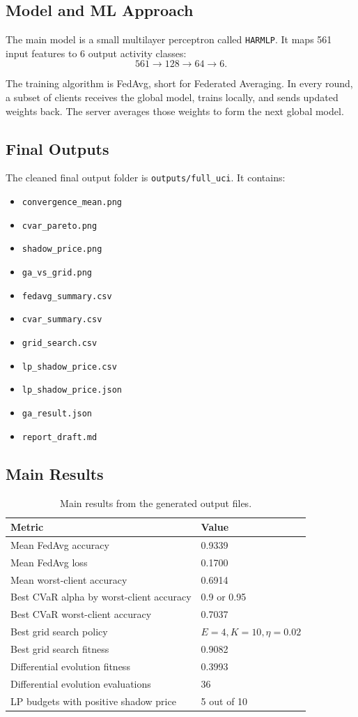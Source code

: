 \documentclass{article}
\begin{document}
\subsection{Model and ML Approach}
The main model is a small multilayer perceptron called \texttt{HARMLP}. It maps 561 input features to 6 output activity classes:
\[
561 \rightarrow 128 \rightarrow 64 \rightarrow 6.
\]

The training algorithm is FedAvg, short for Federated Averaging. In every round, a subset of clients receives the global model, trains locally, and sends updated weights back. The server averages those weights to form the next global model.

\subsection{Final Outputs}
The cleaned final output folder is \texttt{outputs/full\_uci}. It contains:
\begin{itemize}
  \item \texttt{convergence\_mean.png}
  \item \texttt{cvar\_pareto.png}
  \item \texttt{shadow\_price.png}
  \item \texttt{ga\_vs\_grid.png}
  \item \texttt{fedavg\_summary.csv}
  \item \texttt{cvar\_summary.csv}
  \item \texttt{grid\_search.csv}
  \item \texttt{lp\_shadow\_price.csv}
  \item \texttt{lp\_shadow\_price.json}
  \item \texttt{ga\_result.json}
  \item \texttt{report\_draft.md}
\end{itemize}

\subsection{Main Results}
\begin{table}[H]
\centering
\begin{tabular}{ll}
\toprule
Metric & Value \\
\midrule
Mean FedAvg accuracy & 0.9339 \\
Mean FedAvg loss & 0.1700 \\
Mean worst-client accuracy & 0.6914 \\
Best CVaR alpha by worst-client accuracy & 0.9 or 0.95 \\
Best CVaR worst-client accuracy & 0.7037 \\
Best grid search policy & \(E=4, K=10, \eta=0.02\) \\
Best grid search fitness & 0.9082 \\
Differential evolution fitness & 0.3993 \\
Differential evolution evaluations & 36 \\
LP budgets with positive shadow price & 5 out of 10 \\
\bottomrule
\end{tabular}
\caption{Main results from the generated output files.}
\end{table}
\end{document}
